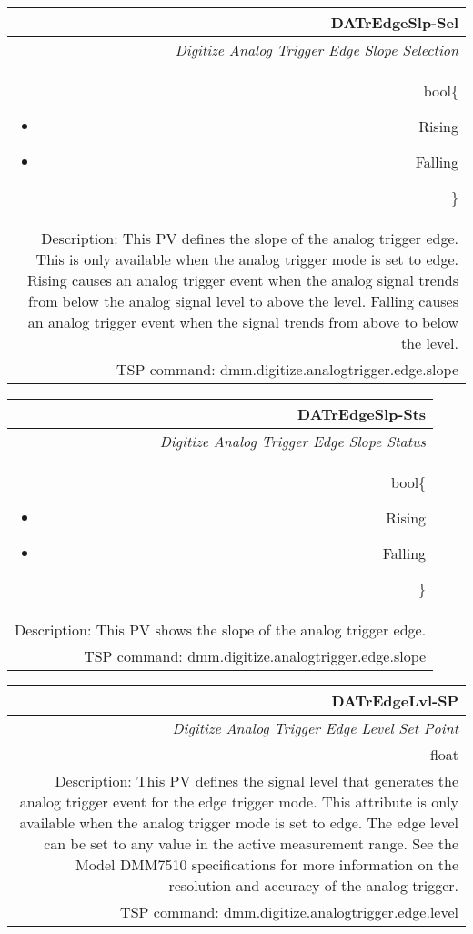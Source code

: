\documentclass[openany]{article}
\begin{document}
		\begin{tabular}{N}
			\hline
			\bfseries DATrEdgeSlp-Sel\label{pv:datredgeslp-sel} \\ \hline
			\emph{Digitize Analog Trigger Edge Slope Selection} \\
			bool\{\begin{itemize}[noitemsep]
				\small
				\item[] Rising
				\item[] Falling
			\end{itemize}\} \\
			Description: This PV defines the slope of the analog trigger edge. This is only available when the analog trigger mode is set to edge. Rising causes an analog trigger event when the analog signal trends from below the analog signal level to above the level. Falling causes an analog trigger event when the signal trends from above to below the level. \\
			TSP command: dmm.digitize.analogtrigger.edge.slope
		\end{tabular}

		\begin{tabular}{N}
			\hline
			\bfseries DATrEdgeSlp-Sts\label{pv:datredgeslp-sts} \\ \hline
			\emph{Digitize Analog Trigger Edge Slope Status} \\
			bool\{\begin{itemize}[noitemsep]
				\small
				\item[] Rising
				\item[] Falling
			\end{itemize}\} \\
			Description: This PV shows the slope of the analog trigger edge. \\
			TSP command: dmm.digitize.analogtrigger.edge.slope
		\end{tabular}

		\begin{tabular}{N}
			\hline
			\bfseries DATrEdgeLvl-SP\label{pv:datredgelvl-sp} \\ \hline
			\emph{Digitize Analog Trigger Edge Level Set Point} \\
			float \\
			Description: This PV defines the signal level that generates the analog trigger event for the edge trigger mode. This attribute is only available when the analog trigger mode is set to edge. The edge level can be set to any value in the active measurement range. See the Model DMM7510 specifications for more information on the resolution and accuracy of the analog trigger. \\
			TSP command: dmm.digitize.analogtrigger.edge.level
		\end{tabular}
\end{document}

